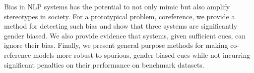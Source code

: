 

Bias in NLP systems has the potential to not only mimic but also amplify stereotypes in society. 
For a prototypical problem, coreference, we provide a method for detecting such bias and show that three systems are significantly gender biased.
We also provide evidence that systems, given sufficient cues, can ignore their bias.
Finally, we present general purpose methods for making co-reference models more robust to spurious, gender-biased cues while not incurring significant penalties on their performance on benchmark datasets. 


